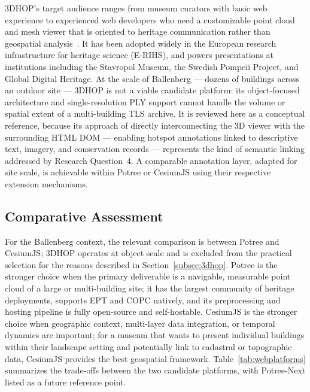 \documentclass[]{report}
\begin{document}
3DHOP's target audience ranges from museum curators with basic web experience to experienced
web developers who need a customizable point cloud and mesh viewer that is oriented to
heritage communication rather than geospatial analysis~\cite{3dhop_website}. It has been
adopted widely in the European research infrastructure for heritage science (E-RIHS), and
powers presentations at institutions including the Stavropol Museum, the Swedish Pompeii
Project, and Global Digital Heritage. At the scale of Ballenberg --- dozens of buildings
across an outdoor site --- 3DHOP is not a viable candidate platform: its object-focused
architecture and single-resolution PLY support cannot handle the volume or spatial extent
of a multi-building TLS archive. It is reviewed here as a conceptual reference, because
its approach of directly interconnecting the 3D viewer with the surrounding HTML DOM ---
enabling hotspot annotations linked to descriptive text, imagery, and conservation records
--- represents the kind of semantic linking addressed by Research Question~4. A comparable
annotation layer, adapted for site scale, is achievable within Potree or CesiumJS using
their respective extension mechanisms.

\subsection{Comparative Assessment}

For the Ballenberg context, the relevant comparison is between Potree and CesiumJS; 3DHOP
operates at object scale and is excluded from the practical selection for the reasons
described in Section~\ref{subsec:3dhop}. Potree is the stronger choice when the primary
deliverable is a navigable, measurable point cloud of a large or multi-building site; it
has the largest community of heritage deployments, supports EPT and COPC natively, and its
preprocessing and hosting pipeline is fully open-source and self-hostable. CesiumJS is the
stronger choice when geographic context, multi-layer data integration, or temporal dynamics
are important; for a museum that wants to present individual buildings within their landscape
setting and potentially link to cadastral or topographic data, CesiumJS provides the best
geospatial framework. Table~\ref{tab:webplatforms} summarizes the trade-offs between the
two candidate platforms, with Potree-Next listed as a future reference point.
\end{document}
